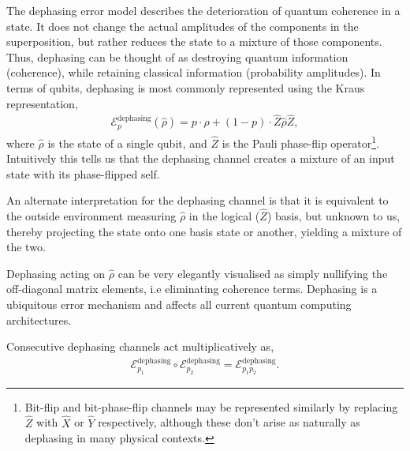 \documentclass[aps,rmp,twocolumn,amsmath,amssymb,nofootinbib,superscriptaddress,longbibliography,floatfix]{revtex4-1}
\begin{document}
The dephasing error model describes the deterioration of quantum coherence in a state. It does not change the actual amplitudes of the components in the superposition, but rather reduces the state to a mixture of those components. Thus, dephasing can be thought of as destroying quantum information (coherence), while retaining classical information (probability amplitudes). In terms of qubits, dephasing is most commonly represented using the Kraus representation,
\begin{align} \label{eq:dephasing_channel}
\mathcal{E}_p^\mathrm{dephasing}(\hat\rho) = p\cdot\hat\rho + (1-p)\cdot \hat{Z}\hat\rho\hat{Z},
\end{align}
where $\hat\rho$ is the state of a single qubit, and $\hat{Z}$ is the Pauli phase-flip operator\footnote{Bit-flip and bit-phase-flip channels may be represented similarly by replacing $\hat{Z}$ with $\hat{X}$ or $\hat{Y}$ respectively, although these don't arise as naturally as dephasing in many physical contexts.}. Intuitively this tells us that the dephasing channel creates a mixture of an input state with its phase-flipped self.

An alternate interpretation for the dephasing channel is that it is equivalent to the outside environment measuring $\hat\rho$ in the logical ($\hat{Z}$) basis, but unknown to us, thereby projecting the state onto one basis state or another, yielding a mixture of the two.

Dephasing acting on $\hat\rho$ can be very elegantly visualised as simply nullifying the off-diagonal matrix elements, i.e eliminating coherence terms. Dephasing is a ubiquitous error mechanism and affects all current quantum computing architectures.

Consecutive dephasing channels act multiplicatively as,
\begin{align} \label{eq:multi_deph}
\mathcal{E}_{p_1}^\mathrm{dephasing} \circ \mathcal{E}_{p_2}^\mathrm{dephasing} = \mathcal{E}_{p_1 p_2}^\mathrm{dephasing}.
\end{align}
\end{document}
